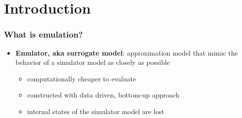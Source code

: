 \documentclass[xcolor=dvipsnames, USenglish]{beamer}  %
\begin{document}
\section{Introduction}

  \begin{frame}
    \frametitle{What is emulation?}
    \begin{itemize}
      \item \textbf{Emulator, aka surrogate model}: approximation model that mimic
      the behavior of a simulator model as closely as possible
      \begin{itemize}
        \item computationally cheaper to evaluate
        \item constructed with data driven, bottom-up approach
        \item internal states of the simulator model are lost
      \end{itemize}
    \end{itemize}

    \begin{figure}[b]
      \centering
    \end{figure}
  \end{frame}

\end{document}
